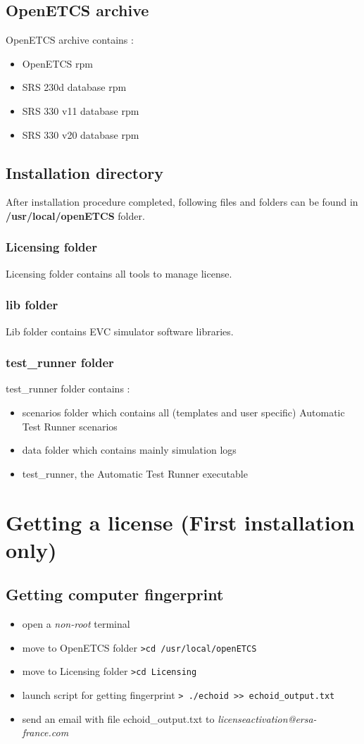 \documentclass{template/openetcs_article}
\begin{document}
\subsection{OpenETCS archive}
OpenETCS archive contains :
\begin{itemize}
	\item OpenETCS rpm
	\item SRS 230d database rpm
	\item SRS 330 v11 database rpm
	\item SRS 330 v20 database rpm
\end{itemize}	
\subsection{Installation directory}
After installation procedure completed, following files and folders can be found in \textbf{/usr/local/openETCS} folder.
\subsubsection{Licensing folder}
Licensing folder contains all tools to manage license.
\subsubsection{lib folder}
Lib folder contains EVC simulator software libraries.
\subsubsection{test\_runner folder}
test\_runner folder contains :
\begin{itemize}
	\item scenarios folder which contains all (templates and user specific) Automatic Test Runner scenarios
	\item data folder which contains mainly simulation logs
	\item test\_runner, the Automatic Test Runner executable
\end{itemize}
\newpage
\section{Getting a license (First installation only)}
\subsection{Getting computer fingerprint}
\begin{itemize}
	\item open a \emph{non-root} terminal
	\item move to OpenETCS folder
	\newline
	\verb|>cd /usr/local/openETCS |	
	\item move to Licensing folder
	\newline
	\verb|>cd Licensing |
	\item launch script for getting fingerprint
	\newline
	\verb|> ./echoid >> echoid_output.txt|	
	\item send an email with file echoid\_output.txt to \emph{licenseactivation@ersa-france.com}
\end{itemize}
\end{document}
